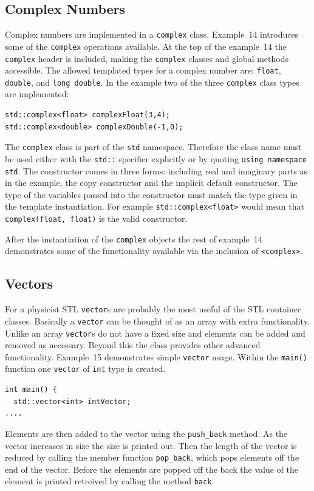 \documentclass[11pt,a4paper]{scrartcl}
\def\main{\texttt{main()}$\;$}
\begin{document}
\subsection{Complex Numbers}
Complex numbers are implemented in a \texttt{complex} class.  
Example~14 introduces some of the \texttt{complex} operations available.  At
the top of the example~14 the \texttt{complex} header is included,
making the
\texttt{complex} classes and global methods accessible.
The allowed templated types for a complex number are:
\texttt{float}, \texttt{double}, and \texttt{long double}.  In the
example two of the three \texttt{complex} class types are implemented:
%
\begin{verbatim}
std::complex<float> complexFloat(3,4);
std::complex<double> complexDouble(-1,0);
\end{verbatim}
%
The \texttt{complex} class is part of the \texttt{std} namespace.
Therefore the class name must be used either with the \texttt{std::} specifier
explicitly or by quoting \texttt{using namespace std}.  The
constructor comes in three forms: including real and imaginary parts
as in the example, the copy constructor and the implicit default
constructor.  The type of the variables passed into the constructor
must match the type given in the template instantiation.  For example
\texttt{std::complex<float>} would mean that \texttt{complex(float,
float)} is the valid constructor.

After the instantiation of the \texttt{complex} objects the rest of
example~14 demonstrates some of the functionality available via the
inclusion of \texttt{<complex>}.


\subsection{Vectors}
For a physicist STL \texttt{vector}s are probably the most useful of
the STL container classes.  Basically a \texttt{vector} can be thought
of as an array with extra functionality.  Unlike an array
\texttt{vector}s do not have a fixed size and elements can be added
and removed as necessary.  Beyond this the class provides other
advanced functionality.  Example~15 demonstrates simple \texttt{vector}
usage.  Within the \main function one \texttt{vector} of \texttt{int}
type is created.
\begin{verbatim}
int main() {
  std::vector<int> intVector;
....
\end{verbatim}
Elements are then added to the vector using the \texttt{push\_back}
method.  As the vector increases in size the size is printed out.
Then the length of the vector is reduced by calling the member
function \texttt{pop\_back}, which pops elements off the end of the
vector.  Before the elements are popped off the back the value of the
element is printed retreived by calling the method \texttt{back}.
\end{document}
